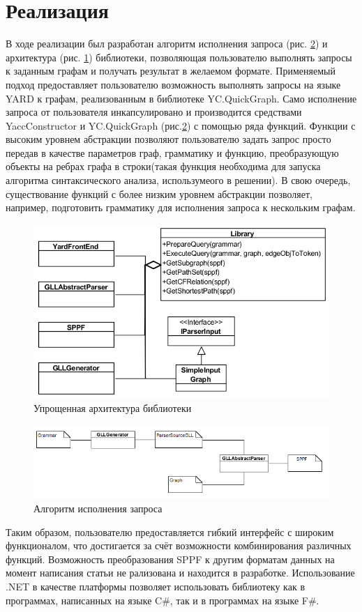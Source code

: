 \documentclass{spisok-article}
\begin{document}
\section{Реализация}
    В ходе реализации был разработан алгоритм исполнения запроса (рис. \ref{pipeline}) и архитектура (рис. \ref{arch_lib}) библиотеки, позволяющая пользователю выполнять запросы к заданным графам и получать результат в желаемом формате. Применяемый подход предоставляет пользователю возможность выполнять запросы на языке YARD к графам, реализованным в библиотеке YC.QuickGraph. Само исполнение запроса от пользователя инкапсулировано и производится средствами YaccConstructor и YC.QuickGraph (рис.\ref{pipeline}) с помощью ряда функций. Функции с высоким уровнем абстракции позволяют пользователю задать запрос просто передав в качестве параметров граф, грамматику и функцию, преобразующую объекты на ребрах графа в строки(такая функция необходима для запуска алгоритма синтаксического анализа, использумеого в решении). В свою очередь, существование функций с более низким уровнем абстракции позволяет, например, подготовить грамматику для исполнения запроса к нескольким графам. 
    \begin{figure}
            \centering
            \includegraphics[width=\textwidth]{pictures/arch.png}
            \caption{Упрощенная архитектура библиотеки}
            \label{arch_lib}
    \end{figure}
    \begin{figure}
            \centering
            \includegraphics[width=\textwidth]{pictures/pipe.png}
            \caption{Алгоритм исполнения запроса}
            \label{pipeline}
    \end{figure}
    Таким образом, пользователю предоставляется гибкий интерфейс с широким функционалом, что достигается за счёт возможности комбинирования различных функций. Возможность преобразования SPPF к другим форматам данных на момент написания статьи не рализована и находится в разработке. Использование .NET в качестве платформы позволяет использовать библиотеку как в программах, написанных на языке C\#, так и в программах на языке F\#. 
\end{document}
